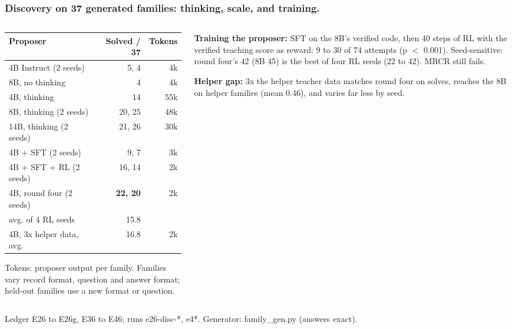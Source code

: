 \documentclass[aspectratio=169,11pt]{beamer}
\newcommand{\source}[1]{\vfill{\scriptsize\color{Gray}#1\par}}
\begin{document}
\begin{frame}[t]
\frametitle{Discovery on 37 generated families: thinking, scale, and training.}
\begin{columns}[T,onlytextwidth]
\begin{column}{.55\textwidth}
\footnotesize
\begin{tabular}{@{}lrr@{}}
\toprule
Proposer & Solved / 37 & Tokens \\
\midrule
4B Instruct (2 seeds) & 5, 4 & 4k \\
8B, no thinking & 4 & 4k \\
4B, thinking & 14 & 55k \\
8B, thinking (2 seeds) & 20, 25 & 48k \\
14B, thinking (2 seeds) & 21, 26 & 30k \\
4B + SFT (2 seeds) & 9, 7 & 3k \\
4B + SFT + RL (2 seeds) & 16, 14 & 2k \\
4B, round four (2 seeds) & \textbf{22, 20} & 2k \\
\quad avg. of 4 RL seeds & 15.8 & \\
4B, 3x helper data, avg. & 16.8 & 2k \\
\bottomrule
\end{tabular}
\medskip

\small Tokens: proposer output per family. Families vary record format, question and answer format; held-out
families use a new format or question.
\end{column}
\begin{column}{.41\textwidth}
\small
\textbf{Training the proposer:} SFT on the 8B's verified code, then 40 steps of RL with the verified teaching
score as reward: 9 to 30 of 74 attempts (p $<$ 0.001). \alert{Seed-sensitive:} round four's 42 (8B 45) is the
best of four RL seeds (22 to 42). MRCR still fails.\par\medskip
\textbf{Helper gap:} 3x the helper teacher data matches round four on solves, reaches the 8B on helper families
(mean 0.46), and varies far less by seed.
\end{column}
\end{columns}
\source{Ledger E26 to E26g, E36 to E46; runs e26-disc-*, e4*. Generator: family\_gen.py (answers exact).}
\end{frame}
\end{document}
